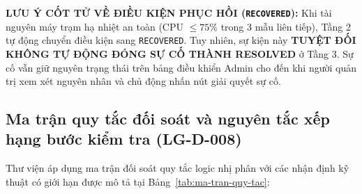 \documentclass[12pt,a4paper]{article}
\begin{document}
\begin{importantbox}
\textbf{LƯU Ý CỐT TỬ VỀ ĐIỀU KIỆN PHỤC HỒI (\texttt{RECOVERED}):}
Khi tài nguyên máy trạm hạ nhiệt an toàn (CPU $\le 75\%$ trong 3 mẫu liên tiếp), Tầng 2 tự động chuyển điều kiện sang \texttt{RECOVERED}. Tuy nhiên, sự kiện này \textbf{TUYỆT ĐỐI KHÔNG TỰ ĐỘNG ĐÓNG SỰ CỐ THÀNH RESOLVED} ở Tầng 3. Sự cố vẫn giữ nguyên trạng thái trên bảng điều khiển Admin cho đến khi người quản trị xem xét nguyên nhân và chủ động nhấn nút giải quyết sự cố.
\end{importantbox}

\subsection{Ma trận quy tắc đối soát và nguyên tắc xếp hạng bước kiểm tra (LG-D-008)}
Thư viện áp dụng ma trận đối soát quy tắc logic nhị phân với các nhận định kỹ thuật có giới hạn được mô tả tại Bảng~\ref{tab:ma-tran-quy-tac}:
\end{document}
